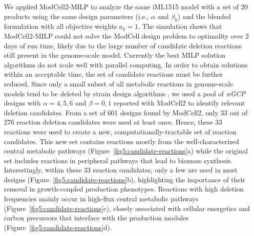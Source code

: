 We applied ModCell2-MILP to analyze the same iML1515 model with a set of 20 products using the same design parameters (i.e., $\alpha$ and $\beta_k$) and the blended formulation with all objective weights $a_k=1$. The simulation shows that ModCell2-MILP could not solve the ModCell design problem to optimality over 2 days of run time, likely due to the large number of candidate deletion reactions still present in the genome-scale model. Currently the best MILP solution algorithms do not scale well with parallel computing. In order to obtain solutions within an acceptable time, the set of candidate reactions must be further reduced. Since only a small subset of all metabolic reactions in genome-scale models tend to be deleted by strain design algorithms \citep{feist2010, king2017, garcia2019}, we used a pool of \textit{wGCP} designs with $\alpha= 4,5,6$ and $\beta = 0,1$ reported with ModCell2 \citep{garcia2019} to identify relevant deletion candidates. From a set of 601 designs found by ModCell2, only 33 out of 276 reaction deletion candidates were used at least once. Hence, these 33 reactions were used to create a new, computationally-tractable set of reaction candidates. This new set contains reactions mostly from the well-characterized central metabolic pathways (Figure~\ref{fig5:candidate-reactions}a) while the original set includes reactions in peripheral pathways that lead to biomass synthesis. Interestingly, within these 33 reaction candidates, only a few are used in most designs (Figure~\ref{fig5:candidate-reactions}b), highlighting the importance of their removal in growth-coupled production phenotypes. Reactions with high deletion frequencies mainly occur in high-flux central metabolic pathways (Figure~\ref{fig5:candidate-reactions}c), closely associated with cellular energetics and carbon precursors that interface with the production modules (Figure~\ref{fig5:candidate-reactions}d).

